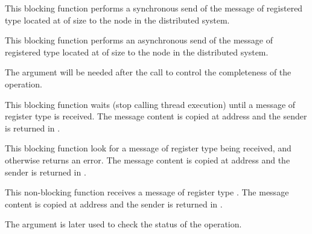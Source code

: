	 {
	   This blocking function performs a synchronous send of the
	   message of registered type  located at
	    of size  to the node
	    in the distributed system.
	 }

	 {
	   This blocking function performs an asynchronous send of the
	   message of registered type  located at
	    of size  to the node
	    in the distributed system.

	   The  argument will be needed after the call
	   to control the completeness of the operation.


	 }

	 {
	   This blocking function waits (stop calling thread execution)
	   until a message of register type  is received.
	   The message content is copied at address  and
	   the sender is returned in .
	 }

	 {
	   This blocking function look for a message of register type
	    being received, and otherwise returns an error.
	   The message content is copied at address  and
	   the sender is returned in .
	 }

	 {
	   This non-blocking function receives a message of register
	   type .
	   The message content is copied at address  and
	   the sender is returned in .

	   The argument  is later used to check the
	   status of the operation.


	 }

